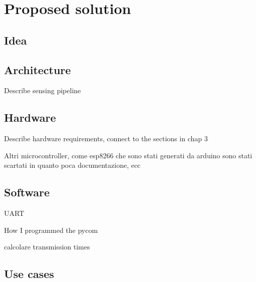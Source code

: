 
\chapter{Proposed solution}\label{chapter:proposed_solution}

\section{Idea}

\section{Architecture}

Describe sensing pipeline 

\section{Hardware}

Describe hardware requirements, connect to the sections in chap 3 

Altri microcontroller, come esp8266 che sono stati generati da arduino sono stati scartati in quanto poca documentazione, ecc

\section{Software}



UART

How I programmed the pycom



calcolare transmission times

\section{Use cases}